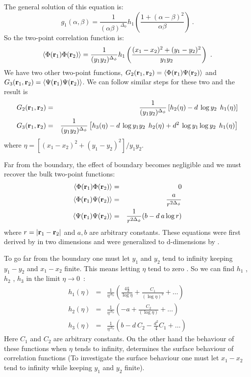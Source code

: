 The general solution of this equation is:
\begin{equation}
g_{1}(\alpha,\beta)=\frac {1}{(\alpha\beta)^{\Delta_{\phi}}}h_{1}\left(\frac {1+(\alpha-\beta)^{2}}{\alpha\beta}\right)~.
\end{equation}
So the two-point correlation function is:
\begin{equation}
\left<{\Phi}({\bf r}_{1})\Phi({\bf r}_{2})\right>=\frac {1}{(y_{1}y_{2})^{\Delta_{\phi}}}h_{1}\left(\frac {(x_{1}-x_{2})^{2}+(y_{1}-y_{2})^{2}}{y_{1}y_{2}}\right)~.
\end{equation}
We have two other two-point functions, $G_{2}({\bf r}_{1},{\bf r}_{2})
=\left<\Phi({\bf r}_{1})\Psi({\bf r}_{2})\right>$ and
$G_{3}({\bf r}_{1},{\bf r}_{2})=\left<\Psi({\bf r}_{1})
\Psi({\bf r}_{2})\right>$.
We can follow similar steps for these two and the result is 
\begin{eqnarray}
G_{2}({\bf r}_{1},{\bf r}_{2})&=&
\frac {1}{(y_{1}y_{2})^{\Delta_{\phi}}}
\left[h_{2}(\eta)-d\:\log{y_{2}}\:\:h_{1}(\eta)\right]\nonumber\\
G_{3}({\bf r}_{1},{\bf r}_{2})&=&
\frac {1}{(y_{1}y_{2})^{\Delta_{\phi}}}\left[h_{3}(\eta)-d\:\log{y_{1}y_{2}}
\:\:h_{2}(\eta)
+d^{2}\:\log{y_{1}}\log{y_{2}}\:\:h_{1}(\eta)\right]
\end{eqnarray}
where $\eta=[(x_{1}-x_{2})^{2}+(y_{1}-y_{2})^{2}]/{y_{1}y_{2}}$.

Far from the boundary, the effect of boundary becomes negligible and we must recover
the bulk two-point functions: 
\begin{eqnarray}
\left<\Phi({\bf r}_{1})\Phi({\bf r}_{2})\right>&=&0\nonumber\\
\left<\Phi({\bf r}_{1})\Psi({\bf r}_{2})\right>&=&
\frac {a}{r^{2\Delta_{\phi}}}\nonumber\\
\left<\Psi({\bf r}_{1})\Psi({\bf r}_{2})\right>&=&
\frac {1}{r^{2\Delta_{\phi}}}(b-d\:a\log{r})
\end{eqnarray}
where $r=|{\bf r}_{1}-{\bf r}_{2}|$ and $a, b$ are arbitrary constants. These
equations were first derived by \cite {Ts} in two dimensions and were
generalized to d-dimensions by \cite {GK}.

To go far from the boundary one must let $y_{1}$ and $y_{2}$ tend to infinity
keeping $y_{1}-y_{2}$ and $x_{1}-x_{2}$ finite. This means letting $\eta$ tend to zero .
So we can find $h_{1}$ , $h_{2}$ , $h_{3}$ in the limit $\eta\rightarrow{0}$~:
\begin{eqnarray}
h_{1}(\eta)&=&\frac {1}{\eta^{\Delta_{\phi}}}\left(\frac {4\frac {a}{d}}{\log{\eta}}+\frac {C_{1}}{(\log{\eta})^{2}}+\ldots\right)\nonumber\\
h_{2}(\eta)&=&\frac {1}{\eta^{\Delta_{\phi}}}\left(-a+\frac {C_{2}}{(\log{\eta})}+\ldots\right)\nonumber\\
h_{3}(\eta)&=&\frac {1}{\eta^{\Delta_{\phi}}}\left(b-d\:C_{2}-\frac {d^{2}}{4}C_{1}+\ldots\right)
\end{eqnarray}
Here $C_{1}$ and $C_{2}$ are arbitrary constants. On the other hand the behaviour
of these functions when $\eta$ tends to infinity, determines the surface behaviour
of correlation functions (To investigate the surface behaviour one must let $x_{1}-x_{2}$ tend to infinity while keeping $y_{1}$ and $y_{2}$
finite).

